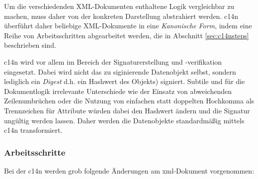 Um die verschiedenden XML-Dokumenten enthaltene Logik vergleichbar zu machen, muss daher von der konkreten Darstellung abstrahiert werden.  \acrlong{c14n} überführt daher beliebige XML-Dokumente in eine \emph{Kanonische Form}, indem eine Reihe von Arbeitsschritten abgearbeitet werden, die in Abschnitt \ref{sec:c14nsteps} beschrieben sind.

\acrlong{c14n} wird vor allem im Bereich der Signaturerstellung und -verifikation eingesetzt. Dabei wird nicht das zu siginierende Datenobjekt selbst, sondern lediglich ein \emph{Digest} d.h. ein Hashwert des Objekts) signiert.\cite[Abschnitt 2.0]{bartel2008xmlsig} Subtile und für die Dokumentlogik irrelevante Unterschiede wie der Einsatz von abweichenden Zeilenumbrüchen oder die Nutzung von einfachen statt doppelten Hochkomma als Trennzeichen für Attribute würden dabei den Hashwert ändern und die Signatur ungültig werden lassen. Daher werden die Datenobjekte standardmäßig mittels \acrlong{c14n} transformiert.\cite[Abschnitt 4.3.3.2]{bartel2008xmlsig}

\subsubsection{Arbeitsschritte}

Bei der \acrlong{c14n} werden grob folgende Änderungen am
\acrshort{xml}-Dokument vorgenommen\cite[Abschnitt 1.1]{boyer2001c14n}:

